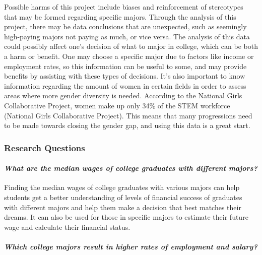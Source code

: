 \documentclass[
]{article}
\begin{document}
Possible harms of this project include biases and reinforcement of
stereotypes that may be formed regarding specific majors. Through the
analysis of this project, there may be data conclusions that are
unexpected, such as seemingly high-paying majors not paying as much, or
vice versa. The analysis of this data could possibly affect one's
decision of what to major in college, which can be both a harm or
benefit. One may choose a specific major due to factors like income or
employment rates, so this information can be useful to some, and may
provide benefits by assisting with these types of decisions. It's also
important to know information regarding the amount of women in certain
fields in order to assess areas where more gender diversity is needed.
According to the National Girls Collaborative Project, women make up
only 34\% of the STEM workforce (National Girls Collaborative Project).
This means that many progressions need to be made towards closing the
gender gap, and using this data is a great start.

\hypertarget{research-questions}{%
\subsubsection{Research Questions}\label{research-questions}}

\hypertarget{what-are-the-median-wages-of-college-graduates-with-different-majors}{%
\paragraph{\texorpdfstring{\emph{What are the median wages of college
graduates with different
majors?}}{What are the median wages of college graduates with different majors?}}\label{what-are-the-median-wages-of-college-graduates-with-different-majors}}

Finding the median wages of college graduates with various majors can
help students get a better understanding of levels of financial success
of graduates with different majors and help them make a decision that
best matches their dreams. It can also be used for those in specific
majors to estimate their future wage and calculate their financial
status.

\hypertarget{which-college-majors-result-in-higher-rates-of-employment-and-salary}{%
\paragraph{\texorpdfstring{\emph{Which college majors result in higher
rates of employment and
salary?}}{Which college majors result in higher rates of employment and salary?}}\label{which-college-majors-result-in-higher-rates-of-employment-and-salary}}
\end{document}
